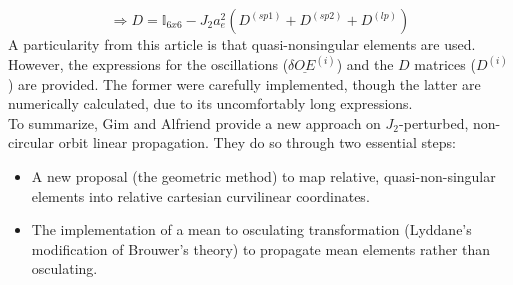 	\begin{equation}
	\Rightarrow D =  \mathbb{I}_{6x6} - J_2 a_e^2 \left( D^{(sp1)} + D^{(sp2)} + D^{(lp)}\right)
	\end{equation}
	\indent A particularity from this article is that quasi-nonsingular elements are used. However, the expressions for the oscillations (\ie $\delta \underline{OE}^{(i)}$) and the $D$ matrices (\ie $D^{(i)}$) are provided. The former were carefully implemented, though the latter are numerically calculated, due to its uncomfortably long expressions. \\
	\indent To summarize, Gim and Alfriend provide a new approach on $J_2$-perturbed, non-circular orbit linear propagation. They do so through two essential steps:
	\begin{itemize}
	\item[\GMVred{I.}] A new proposal (\ie the geometric method) to map relative, quasi-non-singular elements into relative cartesian curvilinear coordinates.
	\item[\GMVred{II.}] The implementation of a mean to osculating transformation (\ie Lyddane's modification of Brouwer's theory) to propagate mean elements rather than osculating.
	\end{itemize}
